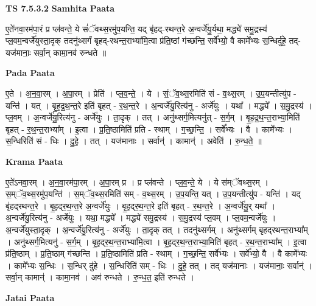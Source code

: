 \documentclass[17pt]{extarticle}
\begin{document}
\textbf{TS 7.5.3.2 } \newline
\textbf{Samhita Paata} \newline

ए॒ते॑नवा॒रम॑पा॒रं प्र प्ल॑वन्ते॒ ये सं॑ॅवथ्स॒रमु॑प॒यन्ति॒ यद् बृ॑हद्-रथन्त॒रे अ॒न्वर्जे॑यु॒र्यथा॒ मद्ध्ये॑ समु॒द्रस्य॑ प्ल॒वम॒न्वर्जे॑युस्ता॒दृक् तदनु॑थ्सर्गं बृहद्-रथन्त॒राभ्या॑मि॒त्वा प्र॑ति॒ष्ठां ग॑च्छन्ति॒ सर्वे᳚भ्यो॒ वै कामे᳚भ्यः स॒न्धिर्दु॑हे॒ तद्-यज॑मानाः॒ सर्वा॒न् कामा॒नव॑ रुन्धते ॥ \newline

\textbf{Pada Paata} \newline

ए॒ते । अ॒न॒वा॒रम् । अ॒पा॒रम् । प्रेति॑ । प्ल॒व॒न्ते॒ । ये । सं॒ॅव॒थ्स॒रमिति॑ सं - व॒थ्स॒रम् । उ॒प॒यन्तीत्यु॑प - यन्ति॑ । यत् । बृ॒ह॒द्र॒थ॒न्त॒रे इति॑ बृहत् - र॒थ॒न्त॒रे । अ॒न्वर्जे॑यु॒रित्य॑नु - अर्जे॑युः । यथा᳚ । मद्ध्ये᳚ । स॒मु॒द्रस्य॑ । प्ल॒वम् । अ॒न्वर्जे॑यु॒रित्य॑नु - अर्जे॑युः । ता॒दृक् । तत् । अनु॑थ्सर्ग॒मित्यनु॑त् - स॒र्ग॒म् । बृ॒ह॒द्र॒थ॒न्त॒राभ्या॒मिति॑ बृहत् - र॒थ॒न्त॒राभ्या᳚म् । इ॒त्वा । प्र॒ति॒ष्ठामिति॑ प्रति -  स्थाम् । ग॒च्छ॒न्ति॒ । सर्वे᳚भ्यः । वै । कामे᳚भ्यः । स॒न्धिरिति॑ सं - धिः । दु॒हे॒ । तत् । यज॑मानाः ।  सर्वान्॑ । कामान्॑ । अवेति॑ । रु॒न्ध॒ते॒ ॥  \newline


\textbf{Krama Paata} \newline

ए॒ते॑ऽनवा॒रम् । अ॒न॒वा॒रम॑पा॒रम् । अ॒पा॒रम् प्र । प्र प्ल॑वन्ते । प्ल॒व॒न्ते॒ ये । ये स॑म्ॅवथ्स॒रम् । स॒म्ॅव॒थ्स॒रमु॑प॒यन्ति॑ । स॒म्ॅव॒थ्स॒रमिति॑ सम् - व॒थ्स॒रम् । उ॒प॒यन्ति॒ यत् । उ॒प॒यन्तीत्यु॑प - यन्ति॑ । यद् बृ॑हद्‍रथन्त॒रे । बृ॒ह॒द्‍र॒थ॒न्त॒रे अ॒न्वर्जे॑युः । बृ॒ह॒द्‍र॒थ॒न्त॒रे इति॑ बृहत् - र॒थ॒न्त॒रे । अ॒न्वर्जे॑यु॒र् यथा᳚ । अ॒न्वर्जे॑यु॒रित्य॑नु - अर्जे॑युः । यथा॒ मद्ध्ये᳚ । मद्ध्ये॑ समु॒द्रस्य॑ । स॒मु॒द्रस्य॑ प्ल॒वम् । प्ल॒वम॒न्वर्जे॑युः । अ॒न्वर्जे॑युस्ता॒दृक् । अ॒न्वर्जे॑यु॒रित्य॑नु - अर्जे॑युः । ता॒दृक् तत् । तदनु॑थ्सर्गम् । अनु॑थ्सर्गम् बृहद्‍रथन्त॒राभ्या᳚म् । अनु॑थ्सर्ग॒मित्यनु॑ - स॒र्ग॒म् । बृ॒ह॒द्‍र॒थ॒न्त॒राभ्या॑मि॒त्वा । बृ॒ह॒द्‍र॒थ॒न्त॒राभ्या॒मिति॑ बृहत् - र॒थ॒न्त॒राभ्या᳚म् । इ॒त्वा प्र॑ति॒ष्ठाम् । प्र॒ति॒ष्ठाम् ग॑च्छन्ति । प्र॒ति॒ष्ठामिति॑ प्रति - स्थाम् । ग॒च्छ॒न्ति॒ सर्वे᳚भ्यः । सर्वे᳚भ्यो॒ वै । वै कामे᳚भ्यः । कामे᳚भ्यः स॒न्धिः । स॒न्धिर् दु॑हे । स॒न्धिरिति॑ सम् - धिः । दु॒हे॒ तत् । तद् यज॑मानाः । यज॑मानाः॒ सर्वान्॑ । सर्वा॒न् कामान्॑ । कामा॒नव॑ । अव॑ रुन्धते । रु॒न्ध॒त॒ इति॑ रुन्धते । \newline

\textbf{Jatai Paata} \newline
\end{document}
